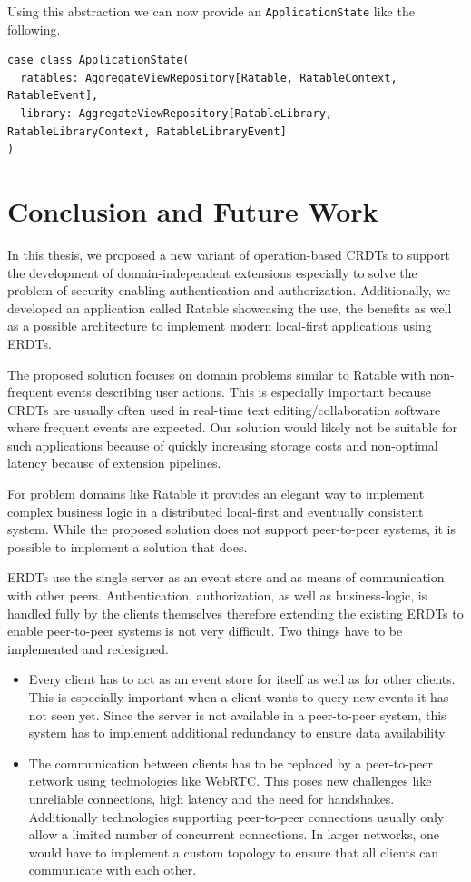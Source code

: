 \documentclass[
	english,
	ruledheaders=section,   %
	class=report,		    %
	thesis={type=bachelor}, %
	accentcolor=9c,			%
	custommargins=true,    %
	marginpar=false,        %
	parskip=half-,          %
	fontsize=11pt,          %
]{tudapub}
\begin{document}
Using this abstraction we can now provide an \texttt{ApplicationState} like the following.

\begin{lstlisting}
case class ApplicationState(
  ratables: AggregateViewRepository[Ratable, RatableContext, RatableEvent],
  library: AggregateViewRepository[RatableLibrary, RatableLibraryContext, RatableLibraryEvent]
)
\end{lstlisting}

\chapter{Conclusion and Future Work}
In this thesis, we proposed a new variant of operation-based CRDTs to support the development of domain-independent extensions especially to solve the problem of security enabling authentication and authorization. Additionally, we developed an application called Ratable showcasing the use, the benefits as well as a possible architecture to implement modern local-first applications using ERDTs.

The proposed solution focuses on domain problems similar to Ratable with non-frequent events describing user actions. This is especially important because CRDTs are usually often used in real-time text editing/collaboration software where frequent events are expected. Our solution would likely not be suitable for such applications because of quickly increasing storage costs and non-optimal latency because of extension pipelines.

For problem domains like Ratable it provides an elegant way to implement complex business logic in a distributed local-first and eventually consistent system. While the proposed solution does not support peer-to-peer systems, it is possible to implement a solution that does.

ERDTs use the single server as an event store and as means of communication with other peers. Authentication, authorization, as well as business-logic, is handled fully by the clients themselves therefore extending the existing ERDTs to enable peer-to-peer systems is not very difficult. Two things have to be implemented and redesigned.

\begin{itemize}
  \item Every client has to act as an event store for itself as well as for other clients. This is especially important when a client wants to query new events it has not seen yet. Since the server is not available in a peer-to-peer system, this system has to implement additional redundancy to ensure data availability.
  \item The communication between clients has to be replaced by a peer-to-peer network using technologies like WebRTC. This poses new challenges like unreliable connections, high latency and the need for handshakes. Additionally technologies supporting peer-to-peer connections usually only allow a limited number of concurrent connections. In larger networks, one would have to implement a custom topology to ensure that all clients can communicate with each other.
\end{itemize}
\end{document}
